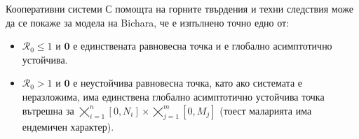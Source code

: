 \begin{frame}[t]{Кооперативни системи}
  С помощта на горните твърдения и техни следствия може да се покаже за модела на Bichara, че е изпълнено точно едно от:
  \begin{itemize}
    \item $\mathscr{R}_0 \leq 1$ и $\mathbf{0}$ е единствената равновесна точка и е глобално асимптотично устойчива.
    \item $\mathscr{R}_0 > 1$ и $\mathbf{0}$ е неустойчива равновесна точка, като ако системата е неразложима, има единствена глобално асимптотично устойчива точка вътрешна за $\bigtimes_{i=1}^{n} [0, N_i] \times \bigtimes_{j=1}^{m} [0, M_j]$ (тоест маларията има ендемичен характер).
  \end{itemize}
\end{frame}

